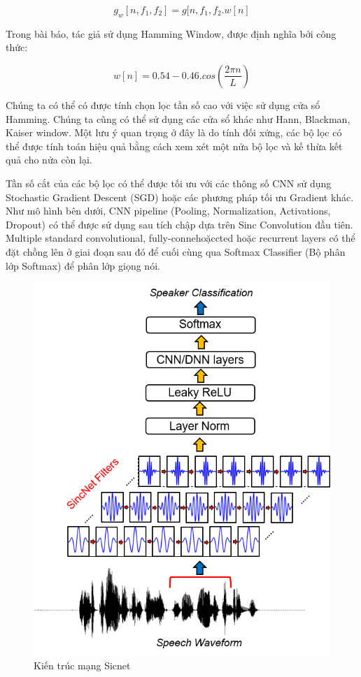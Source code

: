 \documentclass{article}
\begin{document}
	$$g_{w}\left[n, f_1, f_2\right] = g[n, f_1, f_2 . w[n]$$
	
	Trong bài báo, tác giả sử dụng Hamming Window, được định nghĩa bởi công thức:
	
	$$w[n] = 0.54 - 0.46.cos(\frac{2\pi n}{L})$$
	
	
	Chúng ta có thể có được tính chọn lọc tần số cao với việc sử dụng cửa sổ Hamming. Chúng ta cũng có thể sử dụng các cửa sổ khác như Hann, Blackman, Kaiser window. Một lưu ý quan trọng ở đây là do tính đối xứng, các bộ lọc có thể được tính toán hiệu quả bằng cách xem xét một nửa bộ lọc và kế thừa kết quả cho nửa còn lại.
	
	Tần số cắt của các bộ lọc có thể được tối ưu với các thông số CNN sử dụng Stochastic Gradient Descent (SGD) hoặc các phương pháp tối ưu Gradient khác. Như mô hình bên dưới, CNN pipeline (Pooling, Normalization, Activations, Dropout) có thể được sử dụng sau tích chập dựa trên Sinc Convolution đầu tiên. Multiple standard convolutional, fully-connehoặccted hoặc recurrent layers có thể đặt chồng lên ở giai đoạn sau đó để cuối cùng qua Softmax Classifier (Bộ phân lớp Softmax) để phân lớp giọng nói.
	
	\begin{figure}[H]
		\centering
		\includegraphics[width=1\textwidth]{charts/SincNet.png}
		\caption{Kiến trúc mạng Sicnet}
		\label{fig:writing-thesis}
	\end{figure}
\end{document}

